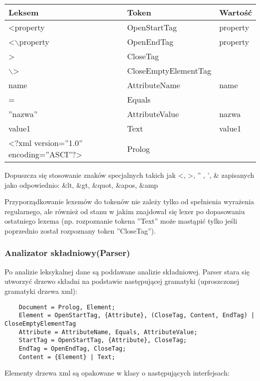\documentclass{article}
\begin{document}
\begin{center}
    \begin{tabular}{ | l | l | l |}
    \hline  
    Leksem & Token & Wartość \\ \hline 
    <property & OpenStartTag & property\\ \hline 
    <$\backslash$property & OpenEndTag & property\\ \hline 
    > & CloseTag &\\ \hline 
    $\backslash$> & CloseEmptyElementTag & \\ \hline 
    name & AttributeName & name \\ \hline
    = & Equals & \\ \hline
    ''nazwa'' & AttributeValue & nazwa \\ \hline
    value1 & Text & value1  \\ \hline
    <?xml version=''1.0'' encoding=''ASCI''?> & Prolog &  \\ \hline
    \end{tabular}
\end{center}

Dopuszcza się stosowanie znaków specjalnych takich jak <, >, '' , ', \&  zapisanych jako odpowiednio:
\&lt, \&gt, \&quot, \&apos, \&amp

Przyporządkowanie lexemów do tokenów nie zależy tylko od spełnienia wyrażenia regularnego, ale również od stanu w jakim znajdował się lexer po dopasowaniu ostatniego lexema
(np. rozpoznanie tokena ''Text'' może mastąpić tylko jeśli poprzednio został rozpoznany token ''CloseTag'').

\subsubsection{Analizator składniowy(Parser)}
Po analizie leksykalnej dane są poddawane analizie składniowej.
Parser stara się utworzyć drzewo składni na podstawie następującej gramatyki
(uproszczonej gramatyki drzewa xml):

\begin{verbatim} 
	Document = Prolog, Element;
	Element	= OpenStartTag, {Attribute}, (CloseTag, Content, EndTag) | CloseEmptyElementTag
	Attribute = AttributeName, Equals, AttributeValue;
	StartTag = OpenStartTag, {Attribute}, CloseTag;
	EndTag = OpenEndTag, CloseTag;
	Content	= {Element} | Text;
\end{verbatim}
	
Elementy drzewa xml są opakowane w klasy o następujących interfejsach:


\end{document}
